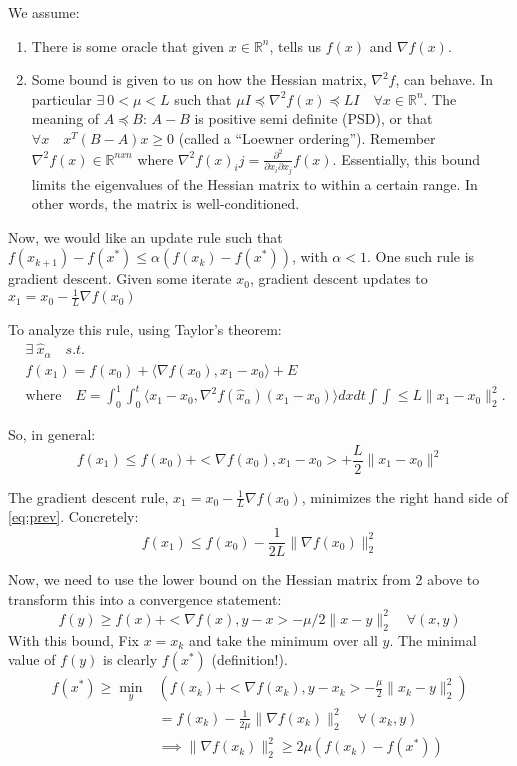 \documentclass[11pt]{article}
\newcommand{\R}{\mathbb{R}}
\begin{document}
We assume:
\begin{enumerate}
    \item There is some oracle that given $x \in \R^n$, tells us $f(x)$ and $\nabla f(x)$.
    \item Some bound is given to us on how the Hessian matrix, $\nabla^2 f$, can behave. In particular $\exists ~ 0 < \mu < L$ such that $\mu I \preceq \nabla^2 f(x) \preceq LI \quad \forall x \in \mathbb{R}^n$. The meaning of $A \preceq B$: $A - B$ is positive semi definite (PSD), or that $\forall x \quad x^T(B-A)x \geq 0$ (called a ``Loewner ordering'').  Remember $\nabla^2 f(x) \in \mathbb{R}^{nxn}$ where $\nabla^2f(x)_ij = \frac{\partial^2}{\partial x_i \partial x_j} f(x)$. Essentially, this bound limits the eigenvalues of the Hessian matrix to within a certain range. In other words, the matrix is well-conditioned.
\end{enumerate}

Now, we would like an update rule such that $f(x_{k+1}) - f(x^*) \leq \alpha (f(x_k) - f(x^*))$, with $\alpha < 1$. One such rule is gradient descent. Given some iterate $x_0$, gradient descent updates to $x_1 = x_0 - \frac{1}{L}\nabla f(x_0)$

To analyze this rule, using Taylor's theorem:
\begin{align}
    &\exists ~ \hat{x}_\alpha \quad s.t.\\
    &f(x_1) = f(x_0) + \langle\nabla f(x_0), x_1 - x_0\rangle + E\\
    &\textrm{where} \quad E = \int_0^1 \int_0^t \langle x_1 - x_0, \nabla^2 f(\hat{x}_{\alpha}) (x_1 - x_0)\rangle dx dt \int\int \leq L \|x_1 - x_0\|^2_2.
    \label{eq:taylor}
\end{align}

So, in general:
\begin{equation}
    f(x_1) \leq f(x_0) + <\nabla f(x_0), x_1 - x_0> + \frac{L}{2} \|x_1 - x_0\|^2
    \label{eq:prev}
\end{equation}

The gradient descent rule, $x_1 = x_0 - \frac{1}{L}\nabla f(x_0)$, minimizes the right hand side of \ref{eq:prev}. Concretely:
\begin{equation}
    f(x_1) \leq f(x_0) - \frac{1}{2L}\|\nabla f(x_0)\|^2_2
    \label{bound1}
\end{equation}

Now, we need to use the lower bound on the Hessian matrix from 2 above to transform this into a convergence statement:
\begin{equation}
    f(y) \geq f(x) + <\nabla f(x), y-x> - \mu/2 \|x-y\|^2_2 \quad \forall (x,y)
\end{equation}
With this bound, Fix $x = x_k$ and take the minimum over all $y$. The minimal value of $f(y)$ is clearly $f(x^*)$ (definition!).
\begin{align}
    f(x^*) \geq \min_y& \left(f(x_k) + <\nabla f(x_k), y-x_k> - \frac{\mu}{2} \|x_k-y\|^2_2\right) \\
    & = f(x_k) - \frac{1}{2\mu} \|\nabla f(x_k)\|^2_2 \quad \forall (x_k,y) \\ 
    &\implies \|\nabla f(x_k)\|_2^2 \geq 2\mu (f(x_k) - f(x^*))
    \label{bound2}
\end{align}
\end{document}

